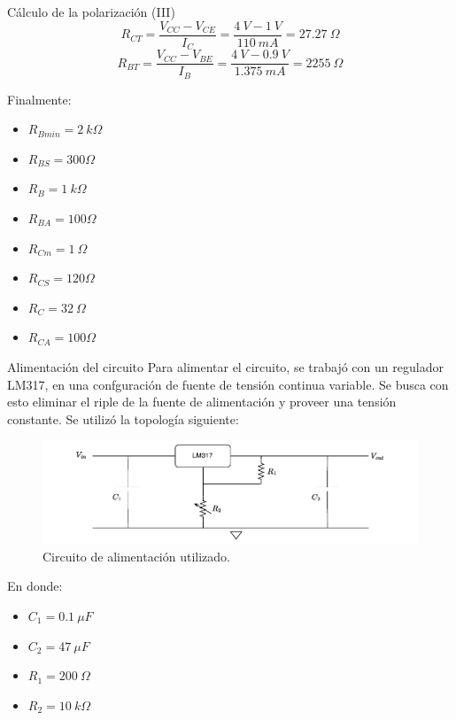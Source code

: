 \documentclass[9pt]{beamer}
\begin{document}
	\begin{frame}{Cálculo de la polarización (III)}
		$$ R_{CT} = \frac{V_{CC}-V_{CE}}{I_C} = \frac{4 \ V - 1 \ V}{110 \ mA}=27.27 \ \Omega$$
		$$ R_{BT} = \frac{V_{CC}-V_{BE}}{I_B} = \frac{4 \ V - 0.9 \ V}{1.375 \ mA}=2255 \ \Omega$$
		
		Finalmente:
		\begin{itemize}[label=\textbullet]
			\item $R_{Bmin} = 2 \ k\Omega$
			\item $R_{BS} = 300 \Omega$
			\item $R_B = 1 \ k\Omega$
			\item $R_{BA} = 100 \Omega$
			\item $R_{Cm} = 1 \ \Omega$
			\item $R_{CS} = 120 \Omega$
			\item $R_C= 32 \ \Omega$
			\item $R_{CA} = 100 \Omega$
		\end{itemize}
	\end{frame}
	
	\begin{frame}{Alimentación del circuito}
		Para alimentar el circuito, se trabajó con un regulador LM317, en una confguración de fuente de tensión continua variable. Se busca con esto eliminar el riple de la fuente de alimentación y proveer una tensión constante. Se utilizó la topología siguiente:
		
		\begin{figure}
			\centering
			\includegraphics[width=0.5\linewidth]{img/lm317}
			\caption{Circuito de alimentación utilizado.}
			\label{fig:lm317}
		\end{figure}
		
		En donde: 
		
		\begin{itemize}[label=\textbullet]
			\item $C_1 = 0.1 \ \mu F$
			\item $C_2 = 47 \ \mu F$
		    \item $R_1 = 200 \ \Omega$
			\item $R_2 = 10 \ k \Omega$
		\end{itemize}
		
	\end{frame}
	
\end{document}
